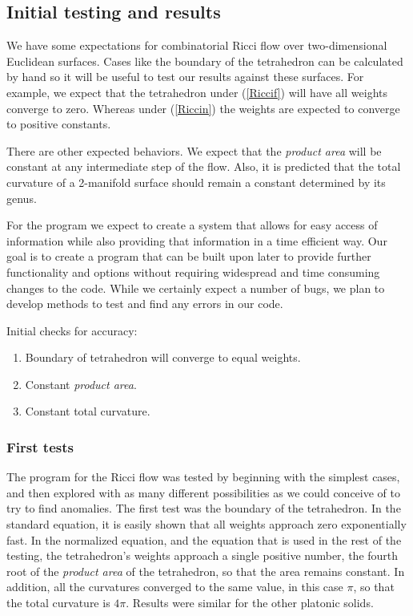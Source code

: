 \documentclass[12pt]{article}
\begin{document}
\subsection{Initial testing and results}
We have some expectations for combinatorial Ricci flow over two-dimensional Euclidean surfaces. Cases like the boundary of the tetrahedron can be calculated by hand so it will be useful to test our results against these surfaces. For example, we expect that the tetrahedron under (\ref{Riccif}) will have all weights converge to zero. Whereas under (\ref{Riccin}) the weights are expected to converge to positive constants.\newline

\noindent There are other expected behaviors. We expect that the \textit{product area} will be constant at any intermediate step of the flow. Also, it is predicted that the total curvature of a 2-manifold surface should remain a constant determined by its genus.\newline

\noindent For the program we expect to create a system that allows for easy access of information while also providing that information in a time efficient way. Our goal is to create a program that can be built upon later to provide further functionality and options without requiring widespread and time consuming changes to the code. While we certainly expect a number of bugs, we plan to develop methods to test and find any errors in our code. \newline

\noindent Initial checks for accuracy:
\begin{enumerate}
\item Boundary of tetrahedron will converge to equal weights.
\item Constant \textit{product area}.
\item Constant total curvature.
\end{enumerate}

\subsubsection{First tests}
\label{InitialResults}
The program for the Ricci flow was tested by beginning with the simplest cases, and then explored with as many different possibilities as we could conceive of to try to find anomalies. The first test was the boundary of the tetrahedron. In the standard equation, it is easily shown that all weights approach zero exponentially fast. In the normalized equation, and the equation that is used in the rest of the testing, the tetrahedron's weights approach a single positive number, the fourth root of the \textit{product area} of the tetrahedron, so that the area remains constant. In addition, all the curvatures converged to the same value, in this case $\pi$, so that the total curvature is $4\pi$. Results were similar for the other platonic solids.\newline
\end{document}

